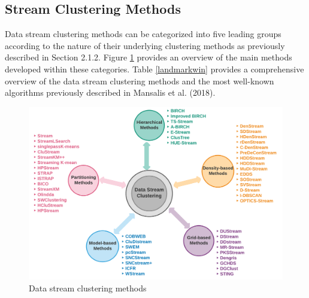 


\subsection{Stream Clustering Methods}

Data stream clustering methods can be categorized into five leading groups according to the nature of their underlying clustering methods as previously described in Section 2.1.2. Figure \ref{method} provides an overview of the main methods developed within these categories. Table \ref{landmarkwin} provides a comprehensive overview of the data stream clustering methods and the most well-known algorithms previously described in Mansalis et al. (2018). 


\begin{figure}
\centering
\includegraphics[width = 12 cm]{image/Chapters/Chapter2/streammethod.png}
\caption{Data stream clustering methods}
\label{method}
\end{figure}


